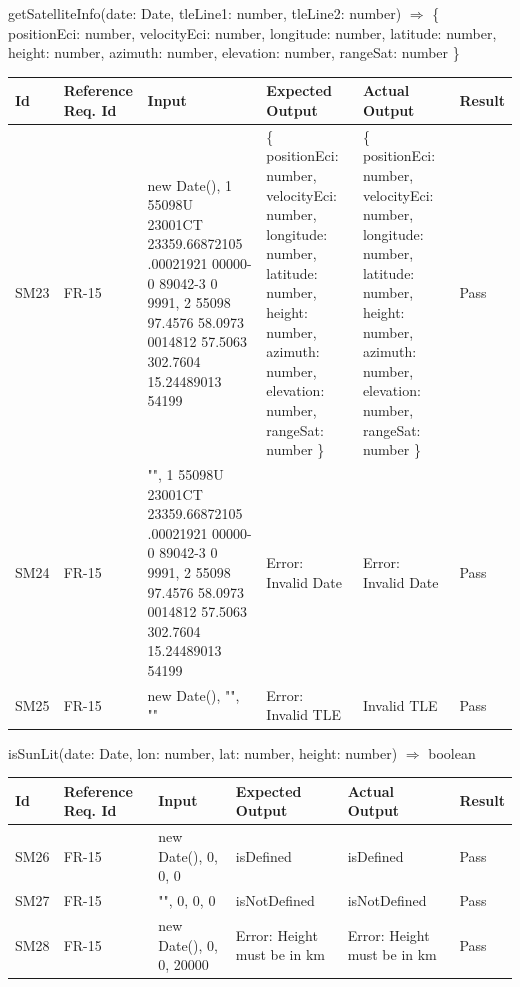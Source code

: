 \documentclass[12pt, titlepage]{article}
\begin{document}
getSatelliteInfo(date: Date, tleLine1: number, tleLine2: number) $\Rightarrow$ \{
    positionEci: number,
    velocityEci: number,
    longitude: number,
    latitude: number,
    height: number,
    azimuth: number,
    elevation: number,
    rangeSat: number
  \}

\begin{center}
\begin{tabular}{|p{1cm} | p{2cm} |p{2cm}| p{2cm} |p{2cm}| p{2cm}|}
\hline
\textbf{Id} & \textbf{Reference Req. Id} & \textbf{Input} & \textbf{Expected Output} & \textbf{Actual Output} & \textbf{Result} \\
\hline
SM23 & FR-15 & { new Date(), 1 55098U 23001CT  23359.66872105  .00021921  00000-0  89042-3 0  9991, 2 55098  97.4576  58.0973 0014812  57.5063 302.7604 15.24489013 54199 } & \{
    positionEci: number,
    velocityEci: number,
    longitude: number,
    latitude: number,
    height: number,
    azimuth: number,
    elevation: number,
    rangeSat: number
  \}
 & \{
    positionEci: number,
    velocityEci: number,
    longitude: number,
    latitude: number,
    height: number,
    azimuth: number,
    elevation: number,
    rangeSat: number
  \} & Pass
\\
\hline
SM24 & FR-15 & { "", 1 55098U 23001CT  23359.66872105  .00021921  00000-0  89042-3 0  9991, 2 55098  97.4576  58.0973 0014812  57.5063 302.7604 15.24489013 54199 } & Error: Invalid Date
 & Error: Invalid Date & Pass
 \\
\hline
SM25 & FR-15 & { new Date(), "", "" } & Error: Invalid TLE
 & Invalid TLE & Pass
 \\
 \hline
\end{tabular}

\end{center}

isSunLit(date: Date, lon: number,
  lat: number,
  height: number) $\Rightarrow$ boolean

\begin{center}
\begin{tabular}{|p{1cm} | p{2cm} |p{2cm}| p{2cm} |p{2cm}| p{2cm}|}
\hline
\textbf{Id} & \textbf{Reference Req. Id} & \textbf{Input} & \textbf{Expected Output} & \textbf{Actual Output} & \textbf{Result} \\
\hline
SM26 & FR-15 & { new Date(), 0, 0, 0 } & isDefined
 & isDefined & Pass
\\
\hline
SM27 & FR-15 & { "", 0, 0, 0 } & isNotDefined
 & isNotDefined & Pass
 \\
\hline
SM28 & FR-15 & { new Date(), 0, 0, 20000} & Error: Height must be in km
 & Error: Height must be in km & Pass
 \\
 \hline
\end{tabular}

\end{center}
\end{document}
